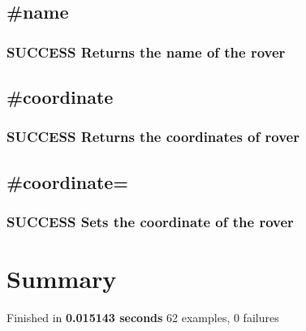 \documentclass{article}
\begin{document}
\subsection{\#name}
\label{sec-10-6}
\subsubsection{\textbf{SUCCESS} Returns the name of the rover}
\label{sec-10-6-1}
\subsection{\#coordinate}
\label{sec-10-7}
\subsubsection{\textbf{SUCCESS} Returns the coordinates of rover}
\label{sec-10-7-1}
\subsection{\#coordinate=}
\label{sec-10-8}
\subsubsection{\textbf{SUCCESS} Sets the coordinate of the rover}
\label{sec-10-8-1}
\section{Summary}
\label{sec-11}

Finished in \textbf{0.015143 seconds}
62 examples, 0 failures
\end{document}
